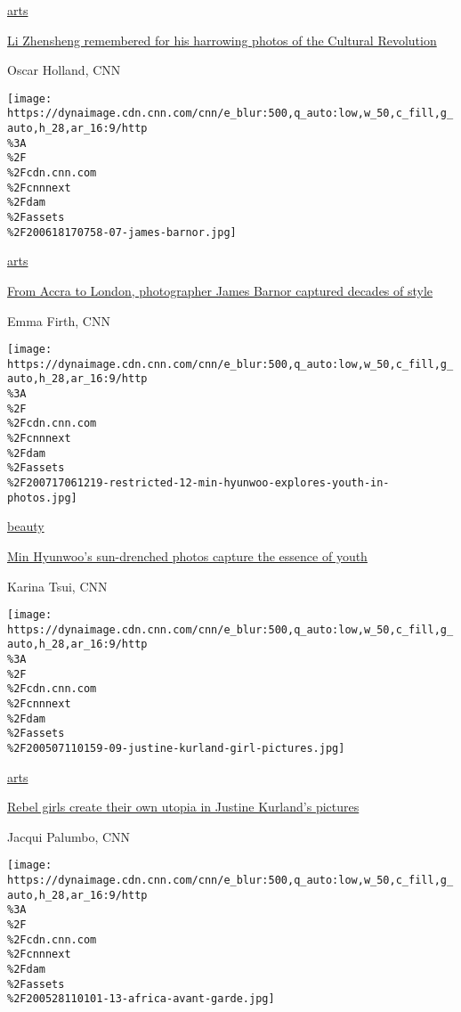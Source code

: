 \href{/style/arts}{arts}

\href{/style/article/li-zhensheng-cultural-revolution/index.html}{Li
Zhensheng remembered for his harrowing photos of the Cultural
Revolution}

Oscar Holland, CNN

\href{/style/article/james-barnor-ghana-photographer/index.html}{}

\texttt{[image: https://dynaimage.cdn.cnn.com/cnn/e\_blur:500,q\_auto:low,w\_50,c\_fill,g\_auto,h\_28,ar\_16:9/http\\\%3A\\\%2F\\\%2Fcdn.cnn.com\\\%2Fcnnnext\\\%2Fdam\\\%2Fassets\\\%2F200618170758-07-james-barnor.jpg]}

\href{/style/arts}{arts}

\href{/style/article/james-barnor-ghana-photographer/index.html}{From
Accra to London, photographer James Barnor captured decades of style}

Emma Firth, CNN

\href{/style/article/min-hyunwoo-summer-photography/index.html}{}

\texttt{[image: https://dynaimage.cdn.cnn.com/cnn/e\_blur:500,q\_auto:low,w\_50,c\_fill,g\_auto,h\_28,ar\_16:9/http\\\%3A\\\%2F\\\%2Fcdn.cnn.com\\\%2Fcnnnext\\\%2Fdam\\\%2Fassets\\\%2F200717061219-restricted-12-min-hyunwoo-explores-youth-in-photos.jpg]}

\href{/style/beauty}{beauty}

\href{/style/article/min-hyunwoo-summer-photography/index.html}{Min
Hyunwoo's sun-drenched photos capture the essence of youth}

Karina Tsui, CNN

\href{/style/article/justine-kurland-girl-pictures/index.html}{}

\texttt{[image: https://dynaimage.cdn.cnn.com/cnn/e\_blur:500,q\_auto:low,w\_50,c\_fill,g\_auto,h\_28,ar\_16:9/http\\\%3A\\\%2F\\\%2Fcdn.cnn.com\\\%2Fcnnnext\\\%2Fdam\\\%2Fassets\\\%2F200507110159-09-justine-kurland-girl-pictures.jpg]}

\href{/style/arts}{arts}

\href{/style/article/justine-kurland-girl-pictures/index.html}{Rebel
girls create their own utopia in Justine Kurland's pictures}

Jacqui Palumbo, CNN

\href{/style/article/a-ti-de-oye-diran-photography/index.html}{}

\texttt{[image: https://dynaimage.cdn.cnn.com/cnn/e\_blur:500,q\_auto:low,w\_50,c\_fill,g\_auto,h\_28,ar\_16:9/http\\\%3A\\\%2F\\\%2Fcdn.cnn.com\\\%2Fcnnnext\\\%2Fdam\\\%2Fassets\\\%2F200528110101-13-africa-avant-garde.jpg]}


